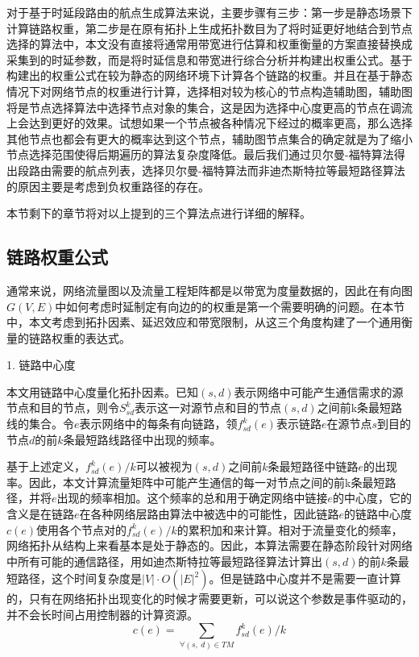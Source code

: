 对于基于时延段路由的航点生成算法来说，主要步骤有三步：第一步是静态场景下计算链路权重，第二步是在原有拓扑上生成拓扑数目为了将时延更好地结合到节点选择的算法中，本文没有直接将通常用带宽进行估算和权重衡量的方案直接替换成采集到的时延参数，而是将时延信息和带宽进行综合分析并构建出权重公式。基于构建出的权重公式在较为静态的网络环境下计算各个链路的权重。并且在基于静态情况下对网络节点的权重进行计算，选择相对较为核心的节点构造辅助图，辅助图将是节点选择算法中选择节点对象的集合，这是因为选择中心度更高的节点在调流上会达到更好的效果。试想如果一个节点被各种情况下经过的概率更高，那么选择其他节点也都会有更大的概率达到这个节点，辅助图节点集合的确定就是为了缩小节点选择范围使得后期遍历的算法复杂度降低。最后我们通过贝尔曼-福特算法得出段路由需要的航点列表，选择贝尔曼-福特算法而非迪杰斯特拉等最短路径算法的原因主要是考虑到负权重路径的存在。

本节剩下的章节将对以上提到的三个算法点进行详细的解释。

\subsection{链路权重公式}

通常来说，网络流量图以及流量工程矩阵都是以带宽为度量数据的，因此在有向图$G(V, E)$中如何考虑时延制定有向边的的权重是第一个需要明确的问题。在本节中，本文考虑到拓扑因素、延迟效应和带宽限制，从这三个角度构建了一个通用衡量的链路权重的表达式。

1. 链路中心度

本文用链路中心度量化拓扑因素。已知$(s,d)$表示网络中可能产生通信需求的源节点和目的节点，则令$S_{sd}^k$表示这一对源节点和目的节点$(s,d)$之间前k条最短路线的集合。令$e$表示网络中的每条有向链路，领$f_{sd}^k(e)$表示链路$e$在源节点$s$到目的节点$d$的前$k$条最短路线路径中出现的频率。

基于上述定义，$f_{sd}^k(e)/k$可以被视为$(s,d)$之间前$k$条最短路径中链路$e$的出现率。因此，本文计算流量矩阵中可能产生通信的每一对节点之间的前k条最短路径，并将$e$出现的频率相加。这个频率的总和用于确定网络中链接$e$的中心度，它的含义是在链路$e$在各种网络层路由算法中被选中的可能性，因此链路$e$的链路中心度$c(e)$使用各个节点对的$f_{sd}^k(e)/k$的累积加和来计算。相对于流量变化的频率，网络拓扑从结构上来看基本是处于静态的。因此，本算法需要在静态阶段针对网络中所有可能的通信路径，用如迪杰斯特拉等最短路径算法计算出$(s,d)$的前$k$条最短路径，这个时间复杂度是$|V|\cdot O({|E|}^2)$。但是链路中心度并不是需要一直计算的，只有在网络拓扑出现变化的时候才需要更新，可以说这个参数是事件驱动的，并不会长时间占用控制器的计算资源。
$$c\left(e\right)=\sum_{\forall(s,\ d)\in T M}{f_{sd}^k\left(e\right)}/k$$

